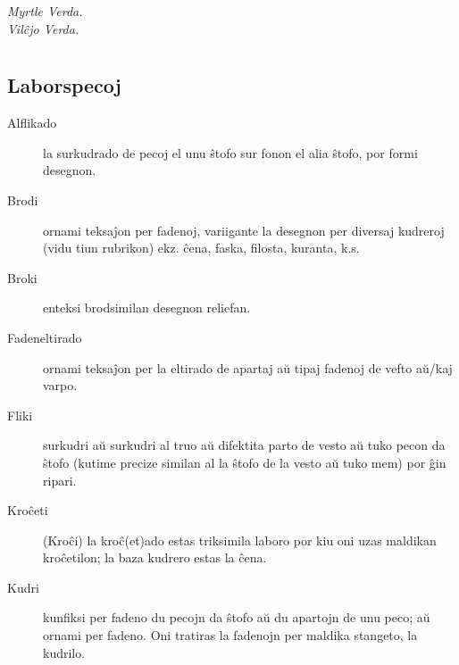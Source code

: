 \begin{flushright}\textit{Myrtle Verda.}\\

\textit{Vilĉjo Verda.}\end{flushright}

\chapter[Terminaro]{}


\section[Laborspecoj]{Laborspecoj}
\hypertarget{Laborspecoj}{}
\label{Laborspecoj}


\begin{description}
\item[Alflikado]

 la surkudrado de pecoj el unu ŝtofo sur fonon el alia ŝtofo, por formi desegnon.

\item[Brodi]

 ornami teksaĵon per fadenoj, variigante la desegnon per diversaj kudreroj (vidu tiun rubrikon) ekz. ĉena, faska, filosta, kuranta, k.s.

\item[Broki]

 enteksi brodsimilan desegnon reliefan.

\item[Fadeneltirado]

 ornami teksaĵon per la eltirado de apartaj aŭ tipaj fadenoj de vefto aŭ\slash kaj varpo.

\item[Fliki]

 surkudri aŭ surkudri al truo aŭ difektita parto de vesto aŭ tuko pecon da ŝtofo (kutime precize similan al la ŝtofo de la vesto aŭ tuko mem) por ĝin ripari.

\item[Kroĉeti]

 (Kroĉi) la kroĉ(et)ado estas triksimila laboro por kiu oni uzas maldikan kroĉetilon; la baza kudrero estas la ĉena. 

\item[Kudri]

 kunfiksi per fadeno du pecojn da ŝtofo aŭ du apartojn de unu peco; aŭ ornami per fadeno. Oni tratiras la fadenojn per maldika stangeto, la kudrilo.


\end{description}
